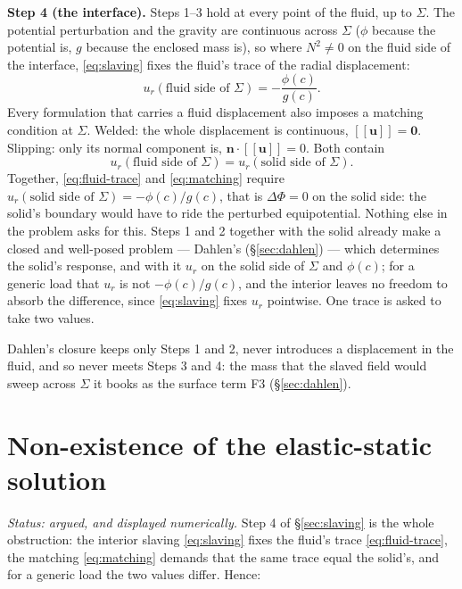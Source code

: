 \documentclass[11pt]{article}
\newcommand{\bu}{\mathbf{u}}
\newcommand{\bn}{\mathbf{n}}
\newcommand{\jump}[1]{[\![#1]\!]}
\begin{document}
\textbf{Step 4 (the interface).} Steps 1--3 hold at every point of the
fluid, up to $\Sigma$. The potential perturbation and the gravity are
continuous across $\Sigma$ ($\phi$ because the potential is, $g$
because the enclosed mass is), so where $N^2 \neq 0$ on the fluid side
of the interface, \eqref{eq:slaving} fixes the fluid's trace of the
radial displacement:
\begin{equation}
  u_r(\text{fluid side of }\Sigma) = -\frac{\phi(c)}{g(c)} .
  \label{eq:fluid-trace}
\end{equation}
Every formulation that carries a fluid displacement also imposes a
matching condition at $\Sigma$. Welded: the whole displacement is
continuous, $\jump{\bu} = \mathbf 0$. Slipping: only its normal
component is, $\bn\cdot\jump{\bu} = 0$. Both contain
\begin{equation}
  u_r(\text{fluid side of }\Sigma) = u_r(\text{solid side of }\Sigma).
  \label{eq:matching}
\end{equation}
Together, \eqref{eq:fluid-trace} and \eqref{eq:matching} require
$u_r(\text{solid side of }\Sigma) = -\phi(c)/g(c)$, that is
$\Delta\Phi = 0$ on the solid side: the solid's boundary would have to
ride the perturbed equipotential. Nothing else in the problem asks for
this. Steps 1 and 2 together with the solid already make a closed and
well-posed problem --- Dahlen's (\S\ref{sec:dahlen}) --- which
determines the solid's response, and with it $u_r$ on the solid side
of $\Sigma$ and $\phi(c)$; for a generic load that $u_r$ is not
$-\phi(c)/g(c)$, and the interior leaves no freedom to absorb the
difference, since \eqref{eq:slaving} fixes $u_r$ pointwise. One trace
is asked to take two values.

Dahlen's closure keeps only Steps 1 and 2, never introduces a
displacement in the fluid, and so never meets Steps 3 and 4: the mass
that the slaved field would sweep across $\Sigma$ it books as the
surface term F3 (\S\ref{sec:dahlen}).

\section{Non-existence of the elastic-static solution}
\label{sec:nonexist}

\emph{Status: argued, and displayed numerically.} Step 4 of
\S\ref{sec:slaving} is the whole obstruction: the interior slaving
\eqref{eq:slaving} fixes the fluid's trace \eqref{eq:fluid-trace}, the
matching \eqref{eq:matching} demands that the same trace equal the
solid's, and for a generic load the two values differ. Hence:
\end{document}
